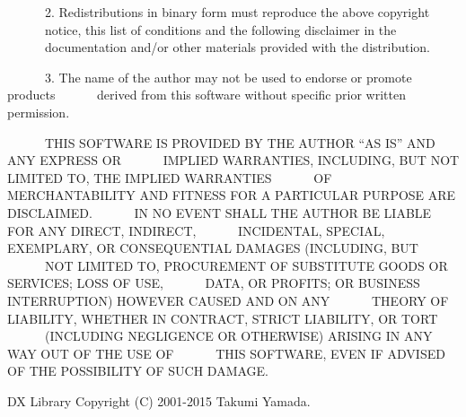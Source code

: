 　　　2. Redistributions in binary form must reproduce the above copyright
　　　notice, this list of conditions and the following disclaimer in the
　　　documentation and/or other materials provided with the distribution.

　　　3. The name of the author may not be used to endorse or promote products
　　　derived from this software without specific prior written permission.

　　　THIS SOFTWARE IS PROVIDED BY THE AUTHOR ``AS IS'' AND ANY EXPRESS OR
　　　IMPLIED WARRANTIES, INCLUDING, BUT NOT LIMITED TO, THE IMPLIED WARRANTIES
　　　OF MERCHANTABILITY AND FITNESS FOR A PARTICULAR PURPOSE ARE DISCLAIMED.
　　　IN NO EVENT SHALL THE AUTHOR BE LIABLE FOR ANY DIRECT, INDIRECT,
　　　INCIDENTAL, SPECIAL, EXEMPLARY, OR CONSEQUENTIAL DAMAGES (INCLUDING, BUT
　　　NOT LIMITED TO, PROCUREMENT OF SUBSTITUTE GOODS OR SERVICES; LOSS OF USE,
　　　DATA, OR PROFITS; OR BUSINESS INTERRUPTION) HOWEVER CAUSED AND ON ANY
　　　THEORY OF LIABILITY, WHETHER IN CONTRACT, STRICT LIABILITY, OR TORT
　　　(INCLUDING NEGLIGENCE OR OTHERWISE) ARISING IN ANY WAY OUT OF THE USE OF
　　　THIS SOFTWARE, EVEN IF ADVISED OF THE POSSIBILITY OF SUCH DAMAGE.

DX Library Copyright (C) 2001-2015 Takumi Yamada.
